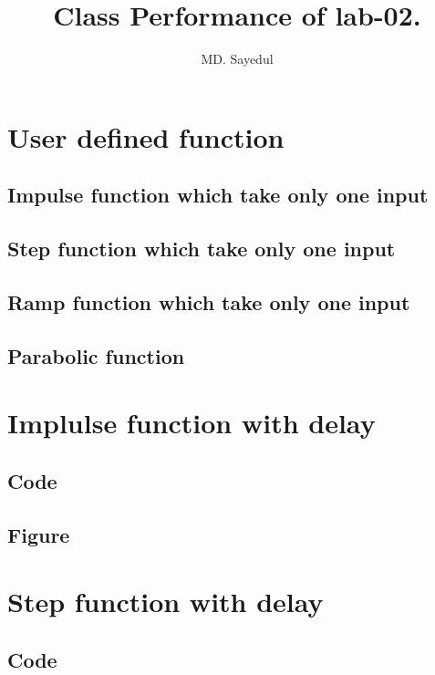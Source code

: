\documentclass[14pt, letterpaper]{article}
\title{Class Performance of lab-02.}
\author{MD. Sayedul}
\begin{document}

\tableofcontents
\newpage

\section{User defined function}
\subsection{Impulse function which take only one input}

\subsection{Step function which take only one input}

\subsection{Ramp function which take only one input}

\subsection{Parabolic function}



\section{Implulse function with delay}
\subsection{Code}

\subsection{Figure}

\section{Step function with delay}
\subsection{Code}

\end{document}

